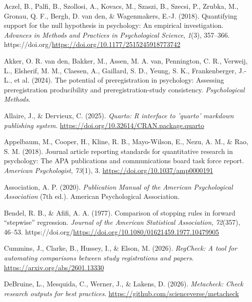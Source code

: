 \documentclass[
  letterpaper,
  12pt]{article}
\newlength{\cslhangindent}
\newenvironment{CSLReferences}[2] %
 {\begin{list}{}{%
  \setlength{\itemindent}{0pt}
  \setlength{\leftmargin}{0pt}
  \setlength{\parsep}{0pt}
  \ifodd #1
   \setlength{\leftmargin}{\cslhangindent}
   \setlength{\itemindent}{-1\cslhangindent}
  \fi
  \setlength{\itemsep}{#2\baselineskip}}}
 {\end{list}}
\begin{document}
\protect{}\label{refs}
\begin{CSLReferences}{1}{0}
Aczel, B., Palfi, B., Szollosi, A., Kovacs, M., Szaszi, B., Szecsi, P.,
Zrubka, M., Gronau, Q. F., Bergh, D. van den, \& Wagenmakers, E.-J.
(2018). Quantifying support for the null hypothesis in psychology: An
empirical investigation. \emph{Advances in Methods and Practices in
Psychological Science}, \emph{1}(3), 357--366.
https://doi.org/\url{https://doi.org/10.1177/2515245918773742}

{Akker, O. R. van den, Bakker, M., Assen, M. A. van, Pennington, C. R.,
Verweij, L., Elsherif, M. M., Claesen, A., Gaillard, S. D., Yeung, S.
K., Frankenberger, J.-L., et al.} (2024). The potential of
preregistration in psychology: Assessing preregistration producibility
and preregistration-study consistency. \emph{Psychological Methods}.

Allaire, J., \& Dervieux, C. (2025). \emph{Quarto: R interface to
'quarto' markdown publishing system}.
\url{https://doi.org/10.32614/CRAN.package.quarto}

Appelbaum, M., Cooper, H., Kline, R. B., Mayo-Wilson, E., Nezu, A. M.,
\& Rao, S. M. (2018). Journal article reporting standards for
quantitative research in psychology: The APA publications and
communications board task force report. \emph{American Psychologist},
\emph{73}(1), 3. \url{https://doi.org/10.1037/amp0000191}

Association, A. P. (2020). \emph{Publication {Manual} of the {American
Psychological Association}} (7th ed.). American Psychological
Association.

Bendel, R. B., \& Afifi, A. A. (1977). Comparison of stopping rules in
forward {``stepwise''} regression. \emph{Journal of the American
Statistical Association}, \emph{72}(357), 46--53.
https://doi.org/\url{https://doi.org/10.1080/01621459.1977.10479905}

Cummins, J., Clarke, B., Hussey, I., \& Elson, M. (2026).
\emph{RegCheck: A tool for automating comparisons between study
registrations and papers}. \url{https://arxiv.org/abs/2601.13330}

DeBruine, L., Mesquida, C., Werner, J., \& Lakens, D. (2026).
\emph{Metacheck: Check research outputs for best practices}.
\url{https://github.com/scienceverse/metacheck}


\end{CSLReferences}
\end{document}
